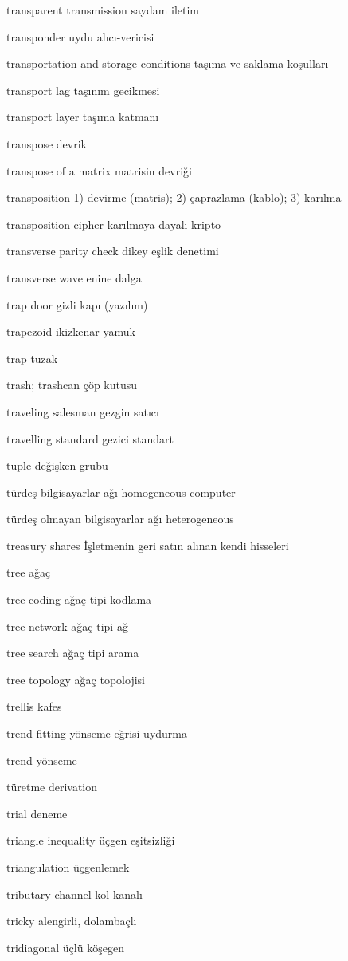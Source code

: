 \documentclass[12pt,fleqn]{article}\usepackage{../../common}
\begin{document}
transparent transmission saydam iletim

transponder uydu alıcı-vericisi

transportation and storage conditions taşıma ve saklama koşulları

transport lag taşınım gecikmesi

transport layer taşıma katmanı

transpose devrik

transpose of a matrix matrisin devriği

transposition 1) devirme (matris); 2) çaprazlama (kablo); 3) karılma

transposition cipher karılmaya dayalı kripto

transverse parity check dikey eşlik denetimi

transverse wave enine dalga

trap door gizli kapı (yazılım)

trapezoid ikizkenar yamuk

trap tuzak

trash; trashcan çöp kutusu

traveling salesman gezgin satıcı

travelling standard gezici standart

tuple değişken grubu

türdeş bilgisayarlar ağı homogeneous computer

türdeş olmayan bilgisayarlar ağı heterogeneous

treasury shares İşletmenin geri satın alınan kendi hisseleri

tree ağaç

tree coding ağaç tipi kodlama

tree network ağaç tipi ağ

tree search ağaç tipi arama

tree topology ağaç topolojisi

trellis kafes

trend fitting yönseme eğrisi uydurma

trend yönseme

türetme derivation

trial deneme

triangle inequality üçgen eşitsizliği

triangulation üçgenlemek

tributary channel kol kanalı

tricky alengirli, dolambaçlı

tridiagonal üçlü köşegen
\end{document}
